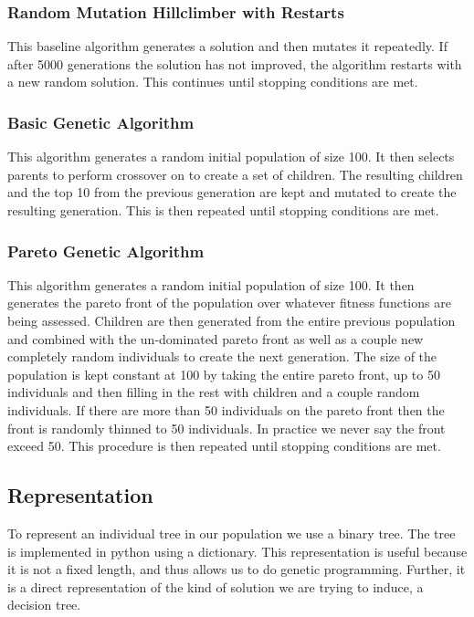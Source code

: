 \documentclass{acm_proc_article-sp}
\begin{document}
\subsubsection{Random Mutation Hillclimber with Restarts}

This baseline algorithm generates a solution and then mutates it repeatedly. If after 5000 generations the solution has not improved, the algorithm restarts with a new random solution. This continues until stopping conditions are met.

\subsubsection{Basic Genetic Algorithm}

This algorithm generates a random initial population of size 100. It then selects parents to perform crossover on to create a set of children. The resulting children and the top 10 from the previous generation are kept and mutated to create the resulting generation. This is then repeated until stopping conditions are met.

\subsubsection{Pareto Genetic Algorithm}

This algorithm generates a random initial population of size 100. It then generates the pareto front of the population over whatever fitness functions are being assessed. Children are then generated from the entire previous population and combined with the un-dominated pareto front as well as a couple new completely random individuals to create the next generation. The size of the population is kept constant at 100 by taking the entire pareto front, up to 50 individuals and then filling in the rest with children and a couple random individuals. If there are more than 50 individuals on the pareto front then the front is randomly thinned to 50 individuals. In practice we never say the front exceed 50. This procedure is then repeated until stopping conditions are met.

\subsection{Representation}

To represent an individual tree in our population we use a binary tree. The tree is implemented in python using a dictionary. This representation is useful because it is not a fixed length, and thus allows us to do genetic programming. Further, it is a direct representation of the kind of solution we are trying to induce, a decision tree.
\end{document}

